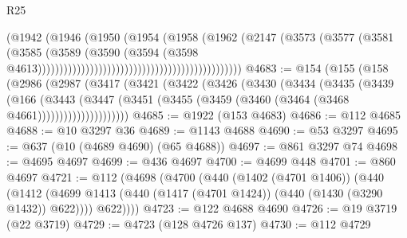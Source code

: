\begin{lexlean}{R25}
\begin{coremodule}
                                                                    (@1942
                                                                      (@1946
                                                                        (@1950
                                                                          (@1954
                                                                            (@1958
                                                                              (@1962
                                                                                (@2147
                                                                                  (@3573
                                                                                    (@3577
                                                                                      (@3581
                                                                                        (@3585
                                                                                          (@3589
                                                                                            (@3590
                                                                                              (@3594
                                                                                                (@3598
                                                                                                  @4613)))))))))))))))))))))))))))))))))))))))))))))))
@4683 := @154
    (@155
      (@158
        (@2986
          (@2987
            (@3417
              (@3421
                (@3422
                  (@3426
                    (@3430
                      (@3434
                        (@3435
                          (@3439
                            (@166
                              (@3443
                                (@3447
                                  (@3451
                                    (@3455 (@3459 (@3460 (@3464 (@3468 @4661)))))))))))))))))))))
@4685 := @1922 (@153 @4683)
@4686 := @112 @4685
@4688 := @10 @3297 @36
@4689 := @1143 @4688
@4690 := @53 @3297
@4695 := @637 (@10 (@4689 @4690) (@65 @4688))
@4697 := @861 @3297 @74
@4698 := @4695 @4697
@4699 := @436 @4697
@4700 := @4699 @448
@4701 := @860 @4697
@4721 := @112
    (@4698
      (@4700
        (@440
          (@1402 (@4701 @1406))
          (@440
            (@1412 (@4699 @1413 (@440 (@1417 (@4701 @1424)) (@440 (@1430 (@3290 @1432)) @622))))
            @622))))
@4723 := @122 @4688 @4690
@4726 := @19 @3719 (@22 @3719)
@4729 := @4723 (@128 @4726 @137)
@4730 := @112 @4729

\end{coremodule}
\end{lexlean}
